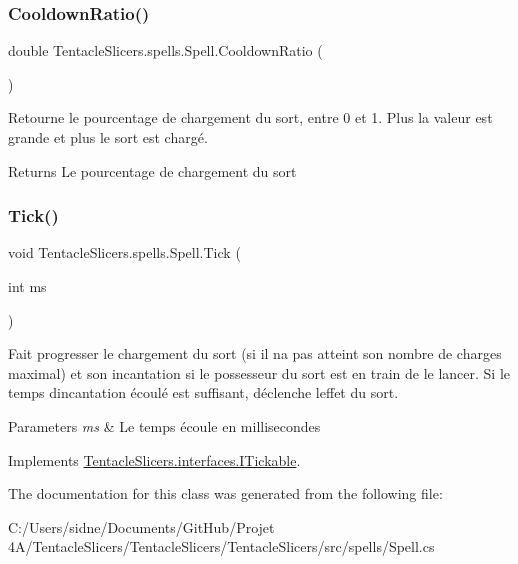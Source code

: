 \subsubsection{\texorpdfstring{Cooldown\+Ratio()}{CooldownRatio()}}
{\footnotesize\ttfamily double Tentacle\+Slicers.\+spells.\+Spell.\+Cooldown\+Ratio (\begin{DoxyParamCaption}{ }\end{DoxyParamCaption})}



Retourne le pourcentage de chargement du sort, entre 0 et 1. Plus la valeur est grande et plus le sort est chargé. 

\begin{DoxyReturn}{Returns}
Le pourcentage de chargement du sort 
\end{DoxyReturn}
\mbox{\label{class_tentacle_slicers_1_1spells_1_1_spell_a5cf10338202ec828cc462808cfa76ee7}} 
\subsubsection{\texorpdfstring{Tick()}{Tick()}}
{\footnotesize\ttfamily void Tentacle\+Slicers.\+spells.\+Spell.\+Tick (\begin{DoxyParamCaption}\item[{int}]{ms }\end{DoxyParamCaption})}



Fait progresser le chargement du sort (si il n\textquotesingle{}a pas atteint son nombre de charges maximal) et son incantation si le possesseur du sort est en train de le lancer. Si le temps d\textquotesingle{}incantation écoulé est suffisant, déclenche l\textquotesingle{}effet du sort. 


\begin{DoxyParams}{Parameters}
{\em ms} & Le temps écoule en millisecondes \\
\hline
\end{DoxyParams}


Implements \hyperlink{interface_tentacle_slicers_1_1interfaces_1_1_i_tickable}{Tentacle\+Slicers.\+interfaces.\+I\+Tickable}.



The documentation for this class was generated from the following file\+:\begin{DoxyCompactItemize}
\item 
C\+:/\+Users/sidne/\+Documents/\+Git\+Hub/\+Projet 4\+A/\+Tentacle\+Slicers/\+Tentacle\+Slicers/\+Tentacle\+Slicers/src/spells/Spell.\+cs\end{DoxyCompactItemize}
